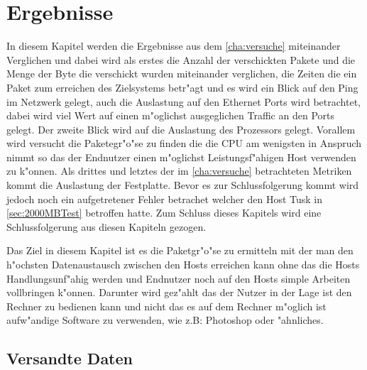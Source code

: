 \chapter{Ergebnisse}
In diesem Kapitel werden die Ergebnisse aus dem \cref{cha:versuche} miteinander Verglichen %
und dabei wird als erstes die Anzahl der verschickten Pakete und die Menge der Byte die %
verschickt wurden miteinander verglichen, die Zeiten die ein Paket zum erreichen des %
Zielsystems betr"agt und es wird ein Blick auf den Ping im Netzwerk gelegt, auch die Auslastung %
auf den Ethernet Ports wird betrachtet, dabei wird viel Wert auf einen m"oglichst ausgeglichen %
Traffic an den Ports gelegt. Der zweite Blick wird auf die Auslastung des Prozessors gelegt. %
Vorallem wird versucht die Paketegr"o"se zu finden die die CPU am wenigsten in Anspruch nimmt %
so das der Endnutzer einen m"oglichst Leistungsf"ahigen Host verwenden zu k"onnen. Als drittes %
und letztes der im \cref{cha:versuche} betrachteten Metriken kommt die Auslastung der Festplatte. %
Bevor es zur Schlussfolgerung kommt wird jedoch noch ein aufgetretener Fehler betrachet welcher den %
Host Tusk in \cref{sec:2000MBTest} betroffen hatte. Zum Schluss dieses Kapitels wird eine Schlussfolgerung %
aus diesen Kapiteln gezogen. %

Das Ziel in diesem Kapitel ist es die Paketgr"o"se zu ermitteln mit der man den h"ochsten Datenaustausch zwischen den %
Hosts erreichen kann ohne das die Hosts Handlungsunf"ahig werden und Endnutzer noch auf %
den Hosts simple Arbeiten vollbringen k"onnen. Darunter wird gez"ahlt das der Nutzer in der %
Lage ist den Rechner zu bedienen kann und nicht das es auf dem Rechner m"oglich ist aufw"andige Software %
zu verwenden, wie z.B: Photoshop oder "ahnliches.  

\section{Versandte Daten}

